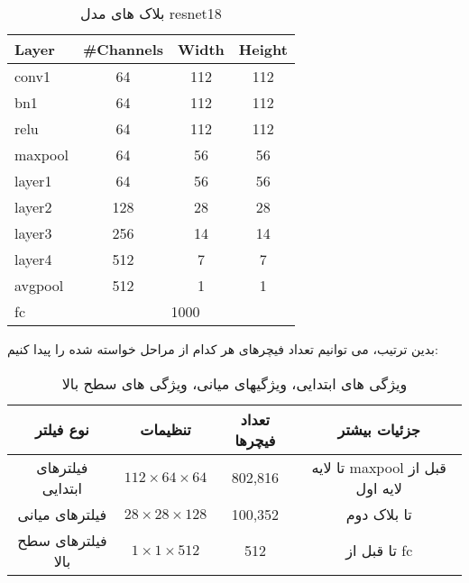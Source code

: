 \documentclass[a4paper,12pt]{article}
\begin{document}
	
\begin{table}[h]
	\centering
	\begin{latin}
	\begin{tabular}{|l|c|c|c|}
		\hline
		\textbf{Layer} & \textbf{\#Channels} & \textbf{Width} & \textbf{Height} \\
		\hline
		conv1 & 64 & 112 & 112 \\
		\hline
		bn1 & 64 & 112 & 112 \\
		\hline
		relu & 64 & 112 & 112 \\
		\hline
		maxpool & 64 & 56 & 56 \\
		\hline
		layer1 & 64 & 56 & 56 \\
		\hline
		layer2 & 128 & 28 & 28 \\
		\hline
		layer3 & 256 & 14 & 14 \\
		\hline
		layer4 & 512 & 7 & 7 \\
		\hline
		avgpool & 512 & 1 & 1 \\
		\hline
		fc & \multicolumn{3}{c|}{1000} \\
		\hline
	\end{tabular}
	\end{latin}	
	\caption{بلاک های مدل resnet18}
	\label{tab:resnet18}
\end{table}
%
%
%
%
%
%
بدین ترتیب، می ‌توانیم تعداد فیچرهای هر کدام از مراحل خواسته شده را پیدا کنیم: 
\begin{table}[h]
	\centering
	\begin{tabular}{|c|c|c|c|}
		\hline
		\textbf{نوع فیلتر} & \textbf{تنظیمات} & \textbf{تعداد فیچرها} & \textbf{جزئیات بیشتر} \\
		\hline
		فیلترهای ابتدایی 
		&  $112 \times 64 \times 64$ & 802,816 & 
		تا لایه maxpool قبل از لایه اول 
		\\
		\hline
		فیلترهای میانی
		 & $28  \times 28 \times 128$ & 100,352 & 
		 تا بلاک دوم \\
		\hline
		فیلترهای سطح بالا &  $1 \times 1 \times 512$ & 512 & تا قبل از fc \\
		\hline
	\end{tabular}
	\caption{ویژگی های ابتدایی، ویژگیهای میانی، ویژگی های سطح بالا}
\end{table}
	
\end{document}
